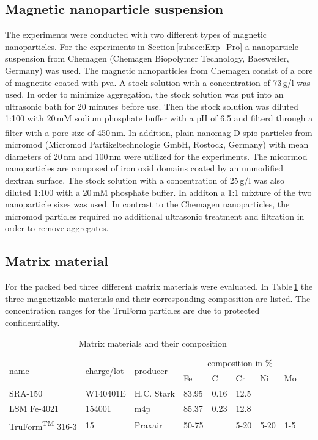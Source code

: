 \subsection{Magnetic nanoparticle suspension}
\label{subsec:Mag_nanoparticles}
The experiments were conducted with two different types of magnetic nanoparticles. For the experiments in Section\,\ref{subsec:Exp_Pro} a nanoparticle suspension from Chemagen (Chemagen Biopolymer Technology, Baesweiler, Germany) was used. The magnetic nanoparticles from Chemagen consist of a core of magnetite coated with \gls{pva}. A stock solution with a concentration of 73\,g/l was used. In order to minimize aggregation, the stock solution was put into an ultrasonic bath for 20 minutes before use. Then the stock solution was diluted 1:100 with 20\,mM sodium phosphate buffer with a pH of 6.5 and filterd through a filter with a pore size of 450\,nm. 
In addition,  plain nanomag\textsuperscript{\textregistered}-D-spio particles from micromod (Micromod Partikeltechnologie GmbH, Rostock, Germany) with mean diameters of 20\,nm and 100\,nm were utilized for the experiments. The micormod nanoparticles are composed of iron oxid domains coated by an unmodified dextran surface. The stock solution with a concentration of 25\,g/l was also diluted 1:100 with a 20\,mM phosphate buffer. In additon a 1:1 mixture of the two nanoparticle sizes was used. In contrast to the Chemagen nanoparticles, the micromod particles required no additional ultrasonic treatment and filtration in order to remove aggregates.     

\subsection{Matrix material}
\label{subsec:Matrix_mat}
For the packed bed three different matrix materials were evaluated. In Table\,\ref{table:mat_material} the three magnetizable materials and their corresponding composition are listed. The concentration ranges for the TruForm particles are due to protected confidentiality. %

\begin{table}[H]
\centering
\caption{Matrix materials and their composition}
\label{table:mat_material}
\begin{tabularx}{\textwidth}{XXXXXXXX}\hline
\multirow{2}{*}{name} & \multirow{2}{*}{charge/lot} & \multirow{2}{*}{producer} & \multicolumn{5}{c}{composition in \%}  \\
& & & Fe & C & Cr & Ni & Mo \\
\hline\hline
SRA-150 & W140401E & H.C. Stark & 83.95 & 0.16 & 12.5  & & \\
LSM Fe-4021 & 154001 & m4p & 85.37 & 0.23 & 12.8 & & \\
TruForm\textsuperscript{TM} 316-3 & 15 & Praxair & 50-75 & & 5-20 &5-20& 1-5\\
\hline
\end{tabularx}
\end{table}

